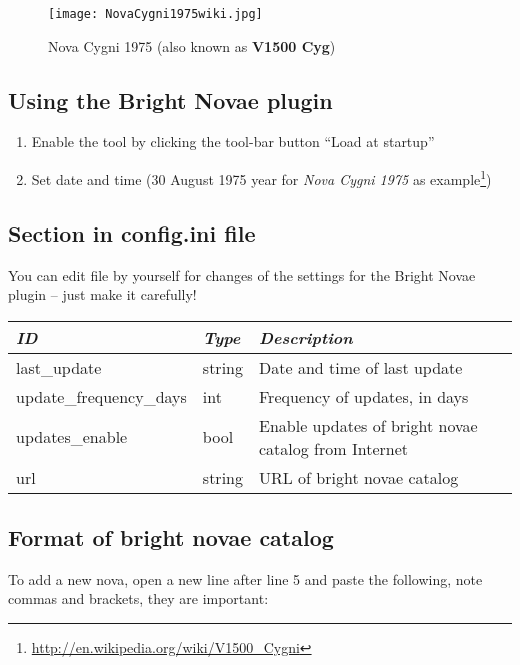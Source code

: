 
\begin{figure}[h]
\texttt{[image: NovaCygni1975wiki.jpg]}
\label{fig:NovaCygni1975}
\caption{Nova Cygni 1975 (also known as \textbf{V1500 Cyg})}
\end{figure}

\subsection{Using the Bright Novae plugin}
\label{sec:plugins:BrighrNovae:using}

\begin{enumerate}
\item Enable the tool by clicking the tool-bar button ``Load at startup''
\item Set date and time (30 August 1975 year for \emph{Nova Cygni 1975} as example\footnote{\url{http://en.wikipedia.org/wiki/V1500_Cygni}})
\end{enumerate}

\subsection{Section  in config.ini file}
\label{sec:plugins:BrightNovae:config}

You can edit  file by yourself for changes of the
settings for the Bright Novae plugin -- just make it carefully!

\begin{longtabu} to \textwidth {l|l|X}
\toprule
\emph{ID} & \emph{Type} & \emph{Description}\tabularnewline
\midrule
last\_update & string & Date and time of last update\tabularnewline
\midrule
update\_frequency\_days & int & Frequency of updates, in days\tabularnewline
\midrule
updates\_enable & bool & Enable updates of bright novae catalog from Internet \tabularnewline
\midrule
url & string & URL of bright novae catalog \tabularnewline
\bottomrule
\end{longtabu}

\subsection{Format of bright novae catalog}
\label{sec:plugins:BrightNovae:format}

To add a new nova, open a new line after line 5 and paste the following,
note commas and brackets, they are important:

